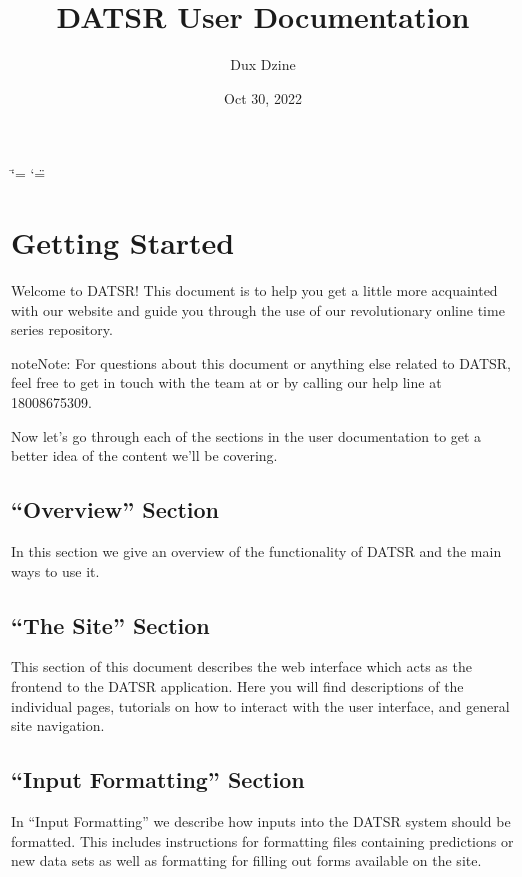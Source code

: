 \documentclass[letterpaper,10pt,english,openany,oneside]{sphinxmanual}
\title{DATSR User Documentation}
\date{Oct 30, 2022}
\author{Dux D\sphinxhyphen{}zine}
\begin{document}
\ifdefined\shorthandoff
  \ifnum\catcode`\=\string=\active\shorthandoff{=}\fi
  \ifnum\catcode`\"=\active{}\fi
\fi

\pagestyle{empty}
\sphinxmaketitle
\pagestyle{plain}
\sphinxtableofcontents
\pagestyle{normal}
\label{\detokenize{index::doc}}


\sphinxstepscope


\chapter{Getting Started}
\label{\detokenize{getting_started:getting-started}}\label{\detokenize{getting_started::doc}}
\sphinxAtStartPar
Welcome to DATSR! This document is to help you get a little more acquainted with our website and guide you through the use of our revolutionary online time series repository.

\begin{sphinxadmonition}{note}{Note:}
\sphinxAtStartPar
For questions about this document or anything else related to DATSR, feel free to get in touch with the team at  or by calling our help line at 1\sphinxhyphen{}800\sphinxhyphen{}867\sphinxhyphen{}5309.
\end{sphinxadmonition}

\sphinxAtStartPar
Now let’s go through each of the sections in the user documentation to get a better idea of the content we’ll be covering.


\section{“Overview” Section}
\label{\detokenize{getting_started:overview-section}}
\sphinxAtStartPar
In this section we give an overview of the functionality of DATSR and the main ways to use it.


\section{“The Site” Section}
\label{\detokenize{getting_started:the-site-section}}
\sphinxAtStartPar
This section of this document describes the web interface which acts as the frontend to the DATSR application. Here you will find descriptions of the individual pages, tutorials on how to interact with the user interface, and general site navigation.


\section{“Input Formatting” Section}
\label{\detokenize{getting_started:input-formatting-section}}
\sphinxAtStartPar
In “Input Formatting” we describe how inputs into the DATSR system should be formatted. This includes instructions for formatting files containing predictions or new data sets as well as formatting for filling out forms available on the site.
\end{document}
